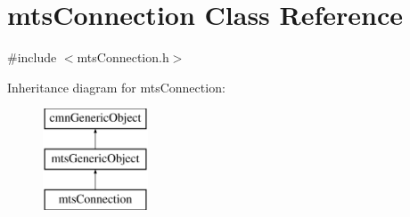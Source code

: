 \hypertarget{classmts_connection}{}\section{mts\+Connection Class Reference}
\label{classmts_connection}


{\ttfamily \#include $<$mts\+Connection.\+h$>$}

Inheritance diagram for mts\+Connection\+:\begin{figure}[H]
\begin{center}
\leavevmode
\includegraphics[height=3.000000cm]{d8/da5/classmts_connection}
\end{center}
\end{figure}

